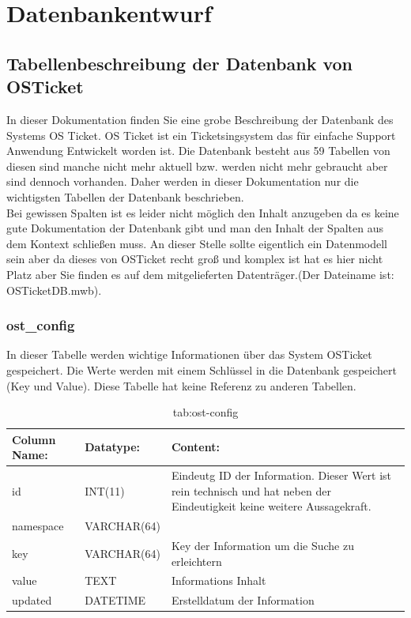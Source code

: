 \newpage
\section{Datenbankentwurf}
\def \currentAuthor{Elias Gabl}

\subsection{Tabellenbeschreibung der Datenbank von OSTicket}

In dieser Dokumentation finden Sie eine grobe Beschreibung der Datenbank des Systems OS Ticket. OS Ticket ist ein Ticketsingsystem das für einfache Support Anwendung Entwickelt worden ist. Die Datenbank besteht aus 59 Tabellen von diesen sind manche nicht mehr aktuell bzw. werden nicht mehr gebraucht aber sind dennoch vorhanden. Daher werden in dieser Dokumentation nur die wichtigsten Tabellen der Datenbank beschrieben.\\
Bei gewissen Spalten ist es leider nicht möglich den Inhalt anzugeben da es keine gute Dokumentation der Datenbank gibt und man den Inhalt der Spalten aus dem Kontext schließen muss.
\newline
\newline
An dieser Stelle sollte eigentlich ein Datenmodell sein aber da dieses von OSTicket recht groß und komplex ist hat es hier nicht Platz aber Sie finden es auf dem mitgelieferten Datenträger.(Der Dateiname ist: OSTicketDB.mwb).

\newpage

\subsubsection{ost\_config}

In dieser Tabelle werden wichtige Informationen über das System OSTicket gespeichert. Die Werte werden mit einem Schlüssel in die Datenbank gespeichert (Key und Value).
Diese Tabelle hat keine Referenz zu anderen Tabellen.

\begin{table}[h]
	\begin{tabular}{|p{3.5cm}|p{4cm}|p{6.2cm}|}
		\hline
		\textbf{Column Name:} & \textbf{Datatype:} & \textbf{Content:}\\
		\hline
		id & INT(11) & Eindeutg ID der Information. Dieser Wert ist rein technisch und hat  neben der Eindeutigkeit keine weitere 
		Aussagekraft. \\
		\hline
		namespace & VARCHAR(64) & \\
		\hline
		key & VARCHAR(64) & Key der Information um die Suche zu erleichtern\\
		\hline
		value & TEXT & Informations Inhalt\\
		\hline
		updated & DATETIME & Erstelldatum der Information\\
		\hline
	\end{tabular}
	\caption{tab:ost-config}
\end{table}
\label{tab:ost_config}
\newpage


